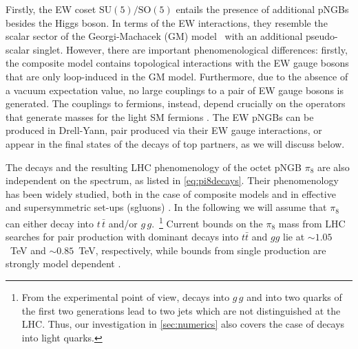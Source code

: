 \documentclass[preprintnumbers,nofootinbib,showpacs,eqsecnum,pre,12pt]{revtex4-1}
\newcommand{\SO}{\text{SO}}
\newcommand{\SU}{\text{SU}}
\begin{document}
Firstly, the EW coset $\SU(5)/\SO(5)$ entails the presence of additional pNGBs besides the Higgs boson. In terms of the EW interactions, they resemble the scalar sector of the Georgi-Machacek (GM) model~\cite{Georgi:1985nv,Chanowitz:1985ug} with an additional pseudo-scalar singlet. However, there are important phenomenological differences: firstly, the composite model contains topological interactions with the EW gauge bosons \cite{Dugan:1984hq} that are only loop-induced in the GM model. Furthermore, due to the absence of a vacuum expectation value, no large couplings to a pair of EW gauge bosons is generated.  The couplings to fermions, instead, depend crucially on the operators that generate masses for the light SM fermions \cite{Agugliaro:2018vsu}. The EW pNGBs can be produced in Drell-Yann, pair produced via their EW gauge interactions, or appear in the final states of the decays of top partners, as we will discuss below.


The decays and the resulting LHC phenomenology of the octet pNGB $\pi_8$ are also independent on the spectrum, as listed in \cref{eq:pi8decays}. Their phenomenology has been widely studied, both in the case of composite models \cite{Cacciapaglia:2015eqa,Belyaev:2016ftv,Cacciapaglia:2020vyf} and in effective and supersymmetric  set-ups (sgluons) \cite{Plehn:2008ae,Choi:2008ub,Chen:2014haa,SekharChivukula:2014uoe,Darme:2018dvz,Carpenter:2020hyz,Darme:2021gtt,Carpenter:2021vga}. 
In the following we will assume that $\pi_8$
can either decay into $t\,\bar{t}$ and/or $g\,g$.~\footnote{From the experimental point of view, decays into $g\,g$ and into two quarks of the first two generations lead to two jets which are
not distinguished at the LHC. Thus, our investigation in \cref{sec:numerics} also covers
the case of decays into light quarks.}  Current bounds on the $\pi_8$ mass from LHC searches for pair production with dominant decays into $t\bar{t}$ and $gg$ lie at $\sim 1.05$~TeV and $\sim 0.85$~TeV, respectively, while bounds from single production are strongly model dependent \cite{Cacciapaglia:2020vyf}.
\end{document}
